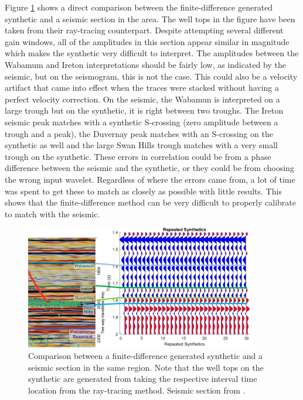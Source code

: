 \documentclass[12pt]{article}
\begin{document}
	Figure \ref{fig:FDseis} shows a direct comparison between the finite-difference generated synthetic and a seismic section in the area. The well tops in the figure have been taken from their ray-tracing counterpart. Despite attempting several different gain windows, all of the amplitudes in this section appear similar in magnitude which makes the synthetic very difficult to interpret. The amplitudes between the Wabamum and Ireton interpretations should be fairly low, as indicated by the seismic, but on the seismogram, this is not the case. This could also be a velocity artifact that came into effect when the traces were stacked without having a perfect velocity correction. On the seismic, the Wabamun is interpreted on a large trough but on the synthetic, it is right between two troughs. The Ireton seismic peak matches with a synthetic S-crossing (zero amplitude between a trough and a peak), the Duvernay peak matches with an S-crossing on the synthetic as well and the large Swan Hills trough matches with a very small trough on the synthetic. These errors in correlation could be from a phase difference between the seismic and the synthetic, or they could be from choosing the wrong input wavelet. Regardless of where the errors came from, a lot of time was spent to get these to match as closely as possible with little results. This shows that the finite-difference method can be very difficult to properly calibrate to match with the seismic.	
	
\begin{figure}[!htb]
	\centering
	\includegraphics[width=0.9\textwidth]{Figures/FDseis.jpg}
	\caption[Fox Creek seismic finite-difference comparison]{Comparison between a finite-difference generated synthetic and a seismic section in the same region. Note that the well tops on the synthetic are generated from taking the respective interval time location from the ray-tracing method. Seismic section from \cite{german2018}. }
	\label{fig:FDseis}
\end{figure}	
	
\end{document}
